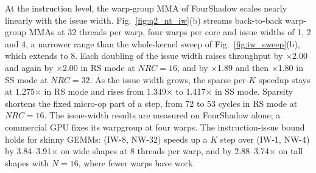 At the instruction level, the warp-group MMA of FourShadow scales nearly linearly with the issue width. Fig.~\ref{fig:q2_nt_iw}(b) streams back-to-back warp-group MMAs at 32 threads per warp, four warps per core and issue widths of 1, 2 and 4, a narrower range than the whole-kernel sweep of Fig.~\ref{fig:iw_sweep}(b), which extends to 8. Each doubling of the issue width raises throughput by $\times$2.00 and again by $\times$2.00 in RS mode at $\mathit{NRC}{=}16$, and by $\times$1.89 and then $\times$1.80 in SS mode at $\mathit{NRC}{=}32$. As the issue width grows, the sparse per-$K$ speedup stays at 1.275$\times$ in RS mode and rises from 1.349$\times$ to 1.417$\times$ in SS mode. Sparsity shortens the fixed micro-op part of a step, from 72 to 53 cycles in RS mode at $\mathit{NRC}{=}16$. The issue-width results are measured on FourShadow alone; a commercial GPU fixes its warpgroup at four warps. \label{sec:skinny_iw}The instruction-issue bound holds for skinny GEMMs: (IW-8, NW-32) speeds up a $K$ step over (IW-1, NW-4) by 3.84--3.91$\times$ on wide shapes at 8 threads per warp, and by 2.88--3.74$\times$ on tall shapes with $N{=}16$, where fewer warps have work.



